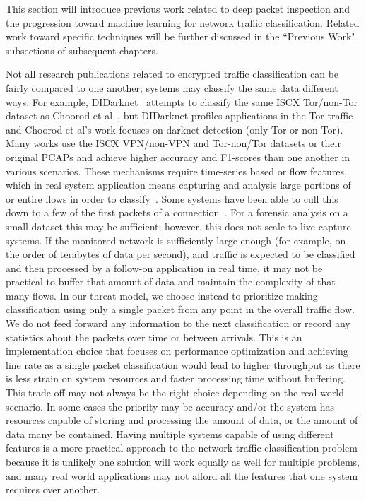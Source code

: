 This section will introduce previous work related to deep packet inspection and the progression toward  machine learning for network traffic classification. Related work toward specific techniques will be further discussed in the ``Previous Work" subsections of subsequent chapters.

Not all research publications related to encrypted traffic classification can be fairly compared to one another; systems may classify the same data different ways. For example, DIDarknet~\cite{didarknet} attempts to classify the same ISCX Tor/non-Tor dataset as Choorod et al~\cite{choorod2022tor}, but DIDarknet profiles applications in the Tor traffic and Choorod et al's work focuses on darknet detection (only Tor or non-Tor). Many works use the ISCX VPN/non-VPN and Tor-non/Tor datasets or their original PCAPs and achieve higher accuracy and F1-scores than one another in various scenarios. These mechanisms require time-series based or flow features, which in real system application means capturing and analysis large portions of or entire flows in order to classify~\cite{perera2017comparison, deeppacket, panchenko2011website, amaral2016machine, cao2014survey, ibrahim2016internet, fan2017investigation, sun2018internet, iscx-tor-paper, iscx-vpn-paper}. Some systems have been able to cull this down to a few of the first packets of a connection~\cite{onlyheader, zhou2018encrypted}. For a forensic analysis on a small dataset this may be sufficient; however, this does not scale to live capture systems. If the monitored network is sufficiently large enough (for example, on the order of terabytes of data per second), and traffic is expected to be classified and then processed by a follow-on application in real time, it may not be practical to buffer that amount of data and maintain the complexity of that many flows. In our threat model, we choose instead to prioritize making classification using only a single packet from any point in the overall traffic flow. We do not feed forward any information to the next classification or record any statistics about the packets over time or between arrivals. This is an implementation choice that focuses on performance optimization and achieving line rate as a single packet classification would lead to higher throughput as there is less strain on system resources and faster processing time without buffering. This trade-off may not always be the right choice depending on the real-world scenario. In some cases the priority may be accuracy and/or the system has resources capable of storing and processing the amount of data, or the amount of data many be contained. Having multiple systems capable of using different features is a more practical approach to the network traffic classification problem because it is unlikely one solution will work equally as well for multiple problems, and many real world applications may not afford all the features that one system requires over another.

